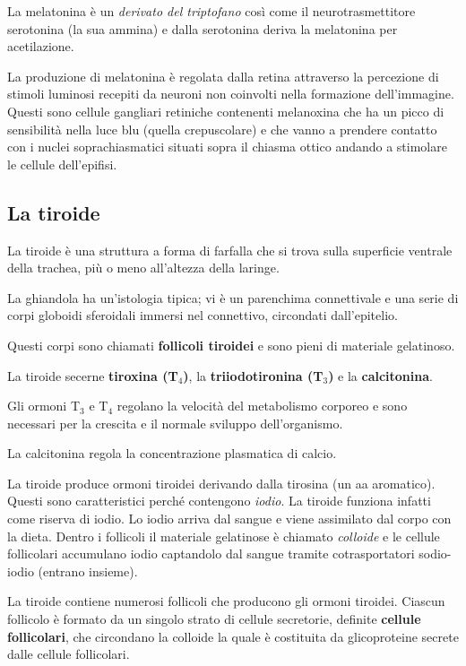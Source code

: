 \documentclass[]{article}
\begin{document}
La melatonina è un \emph{derivato del triptofano} così come il
neurotrasmettitore serotonina (la sua ammina) e dalla serotonina deriva
la melatonina per acetilazione.

La produzione di melatonina è regolata dalla retina attraverso la
percezione di stimoli luminosi recepiti da neuroni non coinvolti nella
formazione dell'immagine. Questi sono cellule gangliari retiniche
contenenti melanoxina che ha un picco di sensibilità nella luce blu
(quella crepuscolare) e che vanno a prendere contatto con i nuclei
soprachiasmatici situati sopra il chiasma ottico andando a stimolare le
cellule dell'epifisi.

\subsection{La tiroide}\label{la-tiroide}

La tiroide è una struttura a forma di farfalla che si trova sulla
superficie ventrale della trachea, più o meno all'altezza della laringe.

La ghiandola ha un'istologia tipica; vi è un parenchima connettivale e
una serie di corpi globoidi sferoidali immersi nel connettivo,
circondati dall'epitelio.

Questi corpi sono chiamati \textbf{follicoli tiroidei} e sono pieni di
materiale gelatinoso.

La tiroide secerne \textbf{tiroxina (T\(_4\))}, la
\textbf{triiodotironina (T\(_3\))} e la \textbf{calcitonina}.

Gli ormoni T\(_3\) e T\(_4\) regolano la velocità del metabolismo
corporeo e sono necessari per la crescita e il normale sviluppo
dell'organismo.

La calcitonina regola la concentrazione plasmatica di calcio.

La tiroide produce ormoni tiroidei derivando dalla tirosina (un aa
aromatico). Questi sono caratteristici perché contengono \emph{iodio}.
La tiroide funziona infatti come riserva di iodio. Lo iodio arriva dal
sangue e viene assimilato dal corpo con la dieta. Dentro i follicoli il
materiale gelatinose è chiamato \emph{colloide} e le cellule follicolari
accumulano iodio captandolo dal sangue tramite cotrasportatori
sodio-iodio (entrano insieme).

La tiroide contiene numerosi follicoli che producono gli ormoni
tiroidei. Ciascun follicolo è formato da un singolo strato di cellule
secretorie, definite \textbf{cellule follicolari}, che circondano la
colloide la quale è costituita da glicoproteine secrete dalle cellule
follicolari.
\end{document}

